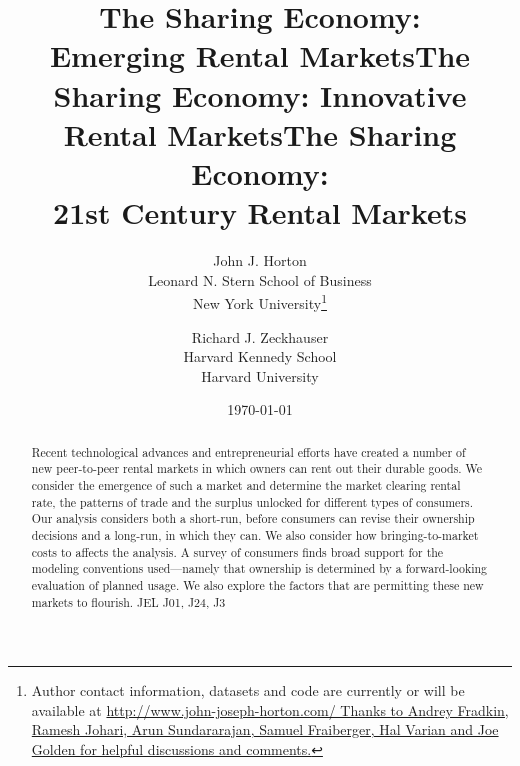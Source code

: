 \documentclass[11pt]{article}
\newcommand{\important}[1]{\textcolor{red}{\textbf{#1}}}
\newcommand{\important}[1]{#1}
\begin{document}
 


\title{The Sharing Economy: \\ Emerging Rental Markets}
\title{The Sharing Economy: Innovative Rental Markets}
\title{The Sharing Economy:\\ 21st Century Rental Markets}


\date{\today}

\author{John J. Horton \\ Leonard N. Stern School of Business \\ New
  York University\footnote{Author contact information, datasets and
    code are currently or will be available at
    \href{http://www.john-joseph-horton.com/}{http://www.john-joseph-horton.com/
    Thanks to Andrey Fradkin, Ramesh Johari, Arun Sundararajan, Samuel Fraiberger, Hal Varian and Joe Golden for helpful discussions and comments.}}
  \and 
  Richard J. Zeckhauser \\ Harvard Kennedy School \\ Harvard University
}
\maketitle


\begin{abstract} 
Recent technological advances and entrepreneurial efforts have created a number of new peer-to-peer rental markets in which owners can rent out their durable goods. 
We consider the emergence of such a market and determine the market clearing rental rate, the patterns of trade and the surplus unlocked for different types of consumers. 
Our analysis considers both a short-run, before consumers can revise their ownership decisions and a long-run, in which they can.
We also consider how bringing-to-market costs to affects the analysis. 
A survey of consumers finds broad support for the modeling conventions used---namely that ownership is determined by a forward-looking evaluation of planned usage.
We also explore the factors that are permitting these new markets to flourish. 
\newline \newline 
\noindent JEL J01, J24, J3 
\end{abstract} 
\end{document}
